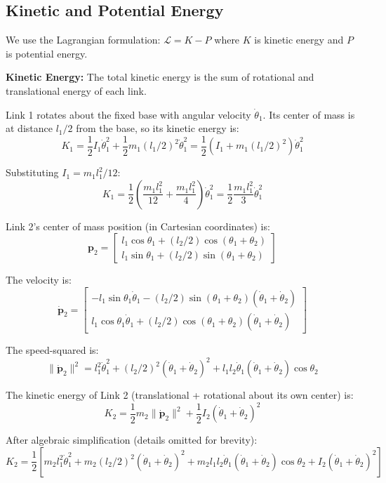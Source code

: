 \subsection{Kinetic and Potential Energy}

We use the Lagrangian formulation: $\mathcal{L} = K - P$ where $K$ is kinetic energy and $P$ is potential energy.

\textbf{Kinetic Energy:} The total kinetic energy is the sum of rotational and translational energy of each link.

Link 1 rotates about the fixed base with angular velocity $\dot{\theta}_1$. Its center of mass is at distance $l_1/2$ from the base, so its kinetic energy is:
\[
K_1 = \frac{1}{2} I_1 \dot{\theta}_1^2 + \frac{1}{2} m_1 (l_1/2)^2 \dot{\theta}_1^2 = \frac{1}{2} \left(I_1 + m_1 (l_1/2)^2\right) \dot{\theta}_1^2
\]

Substituting $I_1 = m_1 l_1^2/12$:
\[
K_1 = \frac{1}{2} \left(\frac{m_1 l_1^2}{12} + \frac{m_1 l_1^2}{4}\right) \dot{\theta}_1^2 = \frac{1}{2} \frac{m_1 l_1^2}{3} \dot{\theta}_1^2
\]

Link 2's center of mass position (in Cartesian coordinates) is:
\[
\mathbf{p}_2 = \begin{bmatrix} l_1 \cos\theta_1 + (l_2/2) \cos(\theta_1 + \theta_2) \\ l_1 \sin\theta_1 + (l_2/2) \sin(\theta_1 + \theta_2) \end{bmatrix}
\]

The velocity is:
\[
\dot{\mathbf{p}}_2 = \begin{bmatrix} -l_1 \sin\theta_1 \dot{\theta}_1 - (l_2/2) \sin(\theta_1 + \theta_2) (\dot{\theta}_1 + \dot{\theta}_2) \\ l_1 \cos\theta_1 \dot{\theta}_1 + (l_2/2) \cos(\theta_1 + \theta_2) (\dot{\theta}_1 + \dot{\theta}_2) \end{bmatrix}
\]

The speed-squared is:
\[
\|\dot{\mathbf{p}}_2\|^2 = l_1^2 \dot{\theta}_1^2 + (l_2/2)^2 (\dot{\theta}_1 + \dot{\theta}_2)^2 + l_1 l_2 \dot{\theta}_1 (\dot{\theta}_1 + \dot{\theta}_2) \cos\theta_2
\]

The kinetic energy of Link 2 (translational + rotational about its own center) is:
\[
K_2 = \frac{1}{2} m_2 \|\dot{\mathbf{p}}_2\|^2 + \frac{1}{2} I_2 (\dot{\theta}_1 + \dot{\theta}_2)^2
\]

After algebraic simplification (details omitted for brevity):
\[
K_2 = \frac{1}{2} \left[ m_2 l_1^2 \dot{\theta}_1^2 + m_2 (l_2/2)^2 (\dot{\theta}_1 + \dot{\theta}_2)^2 + m_2 l_1 l_2 \dot{\theta}_1 (\dot{\theta}_1 + \dot{\theta}_2) \cos\theta_2 + I_2 (\dot{\theta}_1 + \dot{\theta}_2)^2 \right]
\]

